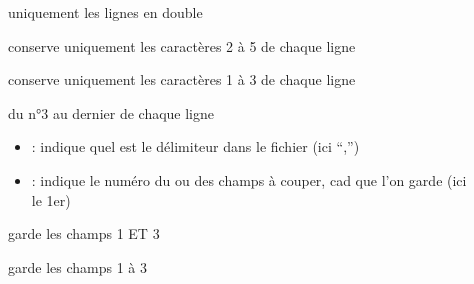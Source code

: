 \documentclass[letterpaper,10pt,french]{sphinxmanual}
\begin{document}
\begin{description}
\item[{}] \leavevmode
uniquement les lignes en double

\item[{}] \leavevmode
conserve uniquement les caractères 2 à 5 de chaque ligne

\item[{}] \leavevmode
conserve uniquement les caractères 1 à 3 de chaque ligne

\item[{}] \leavevmode
du n°3 au dernier de chaque ligne

\item[{}] \leavevmode\begin{itemize}
\item {} 
 : indique quel est le délimiteur dans le fichier (ici “,”)

\item {} 
 : indique le numéro du ou des champs à couper, cad que l’on garde (ici le 1er)

\end{itemize}

\item[{}] \leavevmode
garde les champs 1 ET 3

\item[{}] \leavevmode
garde les champs 1 à 3

\end{description}
\end{document}
